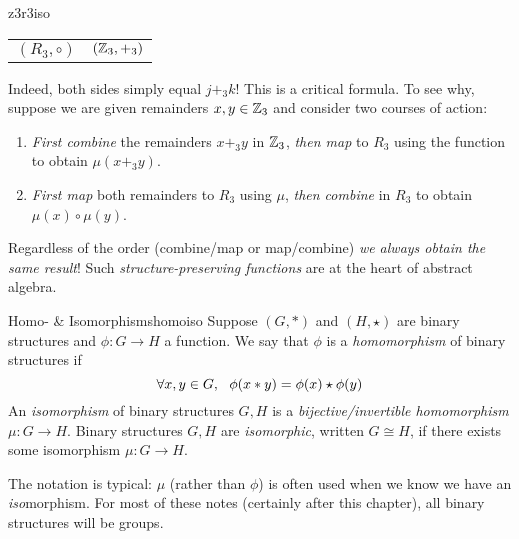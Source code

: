 \begin{example}{}{z3r3iso}
\begin{minipage}[t]{0.36\linewidth}
\begin{tabular}{@{}cc@{}}
			$(R_3,\circ)$
			&
			$(\mathbb{Z}_3,+_3)$
		\end{tabular}
	\end{minipage}\bigbreak
	Indeed, both sides simply equal $j+_3k$! This is a critical formula. To see why, suppose we are given remainders $x,y\in\mathbb{Z}_3$ and consider two courses of action:
	\begin{enumerate}\itemsep2pt
	  \item \emph{First combine} the remainders $x+_3y$ in $\mathbb{Z}_3$, \emph{then map} to $R_3$ using the function to obtain $\mu(x+_3y)$.
	  \item \emph{First map} both remainders to $R_3$ using $\mu$, \emph{then combine} in $R_3$ to obtain $\mu(x)\circ\mu(y)$.
	\end{enumerate}
	Regardless of the order (combine/map or map/combine) \emph{we always obtain the same result}! Such \emph{structure-preserving functions} are at the heart of abstract algebra.
\end{example}


\begin{defn}{Homo- \& Isomorphisms}{homoiso}
	Suppose $(G,\ast)$ and $(H,\star)$ are binary structures and $\phi:G\to H$ a function. We say that $\phi$ is a \emph{homomorphism} of binary structures if
	\[
		\forall x,y\in G,\ \ \phi(x\mathbin{\ast} y)=\phi(x)\mathbin{\star}\phi(y)
	\]
	An \emph{isomorphism}\footnotemark{} of binary structures $G,H$ is a \emph{bijective/invertible homomorphism} $\mu:G\to H$.\smallbreak
	Binary structures $G,H$ are \emph{isomorphic}, written $G\cong H$, if there exists some isomorphism $\mu:G\to H$. 
\end{defn}


The notation is typical: $\mu$ (rather than $\phi$) is often used when we know we have an \emph{iso}morphism. For most of these notes (certainly after this chapter), all binary structures will be groups.


